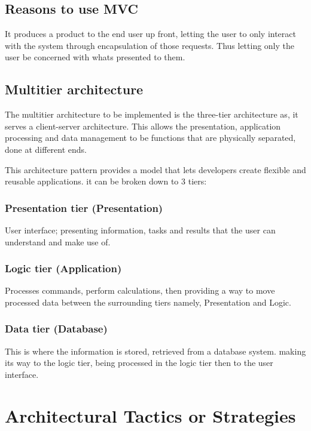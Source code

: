\documentclass[hidelinks,a4paper,12pt]{article}
\begin{document}
\subsection{Reasons to use MVC}
It produces a product to the end user up front, letting the user to only interact with the system through
encapsulation of those requests. Thus letting only the user be concerned with whats presented to them. 

\subsection{Multitier architecture}
The multitier architecture to be implemented is the three-tier architecture as, it serves a client-server architecture.
This allows the presentation, application processing and data management to be functions that are physically separated, 
done at different ends.

This architecture pattern provides a model that lets developers create flexible and reusable applications. 
it can be broken down to 3 tiers: 

\subsubsection{Presentation tier (Presentation)}
User interface; presenting information, tasks and results that the
user can understand and make use of.
\subsubsection{Logic tier (Application)}
Processes commands, perform calculations, then providing a way to move processed data 
between the surrounding tiers namely, Presentation and Logic.
\subsubsection{ Data tier (Database)}
This is where the information is stored, retrieved from a database system. making its way 
to the logic tier, being processed in the logic tier then to the user interface.









		\section{Architectural Tactics or Strategies}
		
\end{document}

